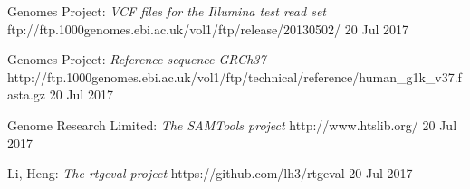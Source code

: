 \begin{thebibliography}{99}
{ Genomes Project}: 
\emph{VCF files for the Illumina test read set}
ftp://ftp.1000genomes.ebi.ac.uk/vol1/ftp/release/20130502/
20 Jul 2017

{ Genomes Project}: 
\emph{Reference sequence GRCh37}
http://ftp.1000genomes.ebi.ac.uk/vol1/ftp/technical/reference/human\_g1k\_v37.fasta.gz
20 Jul 2017

{\sc Genome Research Limited}:
\emph{The SAMTools project}
http://www.htslib.org/
20 Jul 2017

{\sc Li,} Heng: 
\emph{The rtgeval project}
https://github.com/lh3/rtgeval
20 Jul 2017


\end{thebibliography}
